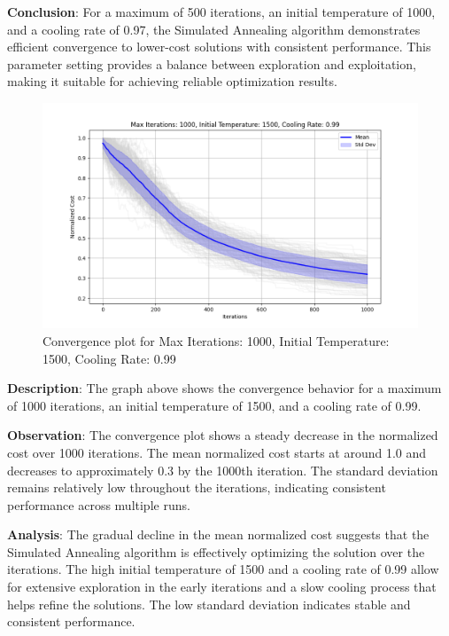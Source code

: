 \documentclass[
]{article}
\begin{document}
    \textbf{Conclusion}: For a maximum of 500 iterations, an initial temperature of 1000, and a cooling rate of 0.97, the Simulated Annealing algorithm demonstrates efficient convergence to lower-cost solutions with consistent performance. This parameter setting provides a balance between exploration and exploitation, making it suitable for achieving reliable optimization results.

    \begin{figure}[H]
        \centering
        \includegraphics[width=\textwidth]{simulated_annealing/max_iter_1000_init_temp_1500_cooling_rate_0.99}
        \caption{Convergence plot for Max Iterations: 1000, Initial Temperature: 1500, Cooling Rate: 0.99}
        \label{fig:sa_1000_1500_0.99}
    \end{figure}

    \textbf{Description}: The graph above shows the convergence behavior for a maximum of 1000 iterations, an initial temperature of 1500, and a cooling rate of 0.99.

    \textbf{Observation}: The convergence plot shows a steady decrease in the normalized cost over 1000 iterations. The mean normalized cost starts at around 1.0 and decreases to approximately 0.3 by the 1000th iteration. The standard deviation remains relatively low throughout the iterations, indicating consistent performance across multiple runs.

    \textbf{Analysis}: The gradual decline in the mean normalized cost suggests that the Simulated Annealing algorithm is effectively optimizing the solution over the iterations. The high initial temperature of 1500 and a cooling rate of 0.99 allow for extensive exploration in the early iterations and a slow cooling process that helps refine the solutions. The low standard deviation indicates stable and consistent performance.
\end{document}
